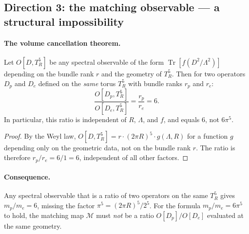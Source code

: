 \subsection{Direction 3: the matching observable --- a structural
  impossibility}
\label{ssec:D3}

\paragraph{The volume cancellation theorem.}
\begin{theorem}
  \label{thm:noRatio}
  Let $O[D, T^5_R]$ be any spectral observable of the form
  $\operatorname{Tr}[f(D^2/\Lambda^2)]$ depending on the bundle rank
  $r$ and the geometry of $T^5_R$.  Then for two operators $D_p$ and
  $D_e$ defined on the \emph{same} torus $T^5_R$ with bundle ranks
  $r_p$ and $r_e$:
  \[
    \frac{O[D_p, T^5_R]}{O[D_e, T^5_R]} = \frac{r_p}{r_e} = 6.
  \]
  In particular, this ratio is independent of $R$, $\Lambda$, and
  $f$, and equals $6$, not $6\pi^5$.
\end{theorem}

\begin{proof}
By the Weyl law, $O[D, T^5_R] = r\cdot(2\pi R)^5\cdot g(\Lambda, R)$
for a function $g$ depending only on the geometric data, not on the
bundle rank $r$.  The ratio is therefore $r_p/r_e = 6/1 = 6$,
independent of all other factors.
\end{proof}

\paragraph{Consequence.}
Any spectral observable that is a ratio of two operators on the same
$T^5_R$ gives $m_p/m_e = 6$, missing the factor $\pi^5 = (2\pi R)^5/2^5$.
For the formula $m_p/m_e = 6\pi^5$ to hold, the matching map
$\mathcal{M}$ must \emph{not} be a ratio $O[D_p]/O[D_e]$ evaluated
at the same geometry.

